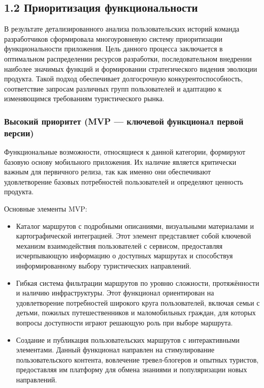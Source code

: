 \subsection*{1.2 Приоритизация функциональности}

В результате детализированного анализа пользовательских историй команда разработчиков сформировала многоуровневую систему приоритизации функциональности приложения. Цель данного процесса заключается в оптимальном распределении ресурсов разработки, последовательном внедрении наиболее значимых функций и формировании стратегического видения эволюции продукта. Такой подход обеспечивает долгосрочную конкурентоспособность, соответствие запросам различных групп пользователей и адаптацию к изменяющимся требованиям туристического рынка.

\subsubsection*{Высокий приоритет (MVP — ключевой функционал первой версии)}
Функциональные возможности, относящиеся к данной категории, формируют базовую основу мобильного приложения. Их наличие является критически важным для первичного релиза, так как именно они обеспечивают удовлетворение базовых потребностей пользователей и определяют ценность продукта.

Основные элементы MVP:
\begin{itemize}
    \item 	Каталог маршрутов с подробными описаниями, визуальными материалами и картографической интеграцией. Этот элемент представляет собой ключевой механизм взаимодействия пользователей с сервисом, предоставляя исчерпывающую информацию о доступных маршрутах и способствуя информированному выбору туристических направлений.
    \item 	Гибкая система фильтрации маршрутов по уровню сложности, протяжённости и наличию инфраструктуры. Этот функционал ориентирован на удовлетворение потребностей широкого круга пользователей, включая семьи с детьми, пожилых путешественников и маломобильных граждан, для которых вопросы доступности играют решающую роль при выборе маршрута.
    \item 	Создание и публикация пользовательских маршрутов с интерактивными элементами. Данный функционал направлен на стимулирование пользовательского контента, вовлечение тревел-блогеров и опытных туристов, предоставляя им платформу для обмена знаниями и популяризации новых направлений.
\end{itemize}


